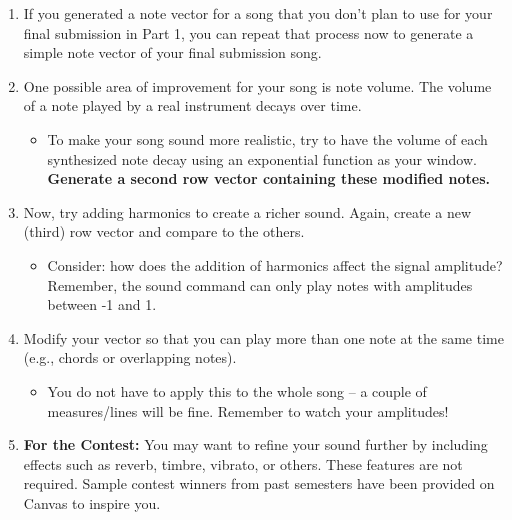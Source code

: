 \documentclass[12pt]{article}
\begin{document}
\begin{enumerate}

\item If you generated a note vector for a song that you don't plan to use for your final submission in Part 1, you can repeat that process now to generate a simple note vector of your final submission song.
\item One possible area of improvement for your song is note volume. The volume of a note played by a real instrument decays over time. 
\begin{itemize}
    \item To make your song sound more realistic, try to have the volume of each synthesized note decay using an exponential function as your window. \textbf{Generate a second row vector containing these modified notes.}
\end{itemize}



\item Now, try adding harmonics to create a richer sound. Again, create a new (third) row vector and compare to the others. 
\begin{itemize}
    \item Consider: how does the addition of harmonics affect the signal amplitude? Remember, the sound command can only play notes with amplitudes between -1 and 1.
\end{itemize}




\item Modify your vector so that you can play more than one note at the same time (e.g., chords or overlapping notes).
\begin{itemize}
    \item You do not have to apply this to the whole song – a couple of measures/lines will be fine. Remember to watch your amplitudes!
\end{itemize} 

\item \textbf{For the Contest:} You may want to refine your sound further by including effects such as reverb, timbre, vibrato, or others. These features are not required. Sample contest winners from past semesters have been provided on Canvas to inspire you.
\end{enumerate}
\end{document}
